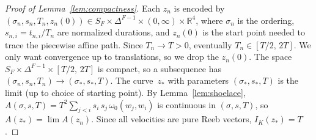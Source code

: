 \begin{proof}[Proof of Lemma~\ref{lem:compactness}]
Each $z_n$ is encoded by
$(\sigma_n, s_n, T_n, z_n(0)) \in S_F \times \Delta^{F-1} \times (0,\infty) \times \mathbb{R}^4$,
where $\sigma_n$ is the ordering,
$s_{n,i} = t_{n,i} / T_n$ are normalized durations,
and $z_n(0)$ is the start point needed to trace the piecewise affine path.
Since $T_n \to T > 0$, eventually
$T_n \in [T/2,\, 2T]$.
We only want convergence up to translations, so we drop the $z_n(0)$.
The space
$S_F \times \Delta^{F-1} \times [T/2,\, 2T]$
is compact, so a subsequence has
$(\sigma_n, s_n, T_n) \to (\sigma_*, s_*, T)$.
The curve~$z_*$ with parameters
$(\sigma_*, s_*, T)$ is the limit (up to choice of starting point).
By Lemma~\ref{lem:shoelace},
$A(\sigma, s, T) = T^2 \sum_{j<i} s_i\, s_j\,
\omega_0(w_j, w_i)$ is continuous in $(\sigma, s, T)$,
so $A(z_*) = \lim A(z_n)$.
Since all velocities are pure Reeb vectors,
$I_K(z_*) = T$.
\end{proof}

